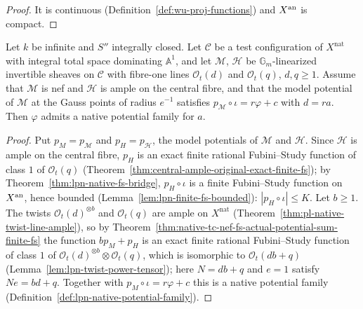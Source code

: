 \begin{proof}
It is continuous (Definition~\ref{def:wu-proj-functions}) and $X^{\mathrm{an}}$ is compact.
\end{proof}

\begin{theorem}\label{thm:lpn-native-potential-family-of-tc}
\leanok
{}
Let $k$ be infinite and $S''$ integrally closed. Let $\mathcal C$ be a test configuration of $X^{\mathrm{nat}}$ with
integral total space dominating $\mathbb A^1$, and let $\mathcal M$, $\mathcal H$ be $\mathbb G_m$-linearized
invertible sheaves on $\mathcal C$ with fibre-one lines $\mathcal O_t(d)$ and $\mathcal O_t(q)$, $d,q\ge1$. Assume
that $\mathcal M$ is nef and $\mathcal H$ is ample on the central fibre, and that the model potential of
$\mathcal M$ at the Gauss points of radius $e^{-1}$ satisfies $p_{\mathcal M}\circ\iota=r\varphi+c$ with $d=ra$. Then
$\varphi$ admits a native potential family for $a$.
\end{theorem}

\begin{proof}
Put $p_M=p_{\mathcal M}$ and $p_H=p_{\mathcal H}$, the model potentials of $\mathcal M$ and $\mathcal H$. Since
$\mathcal H$ is ample on the central fibre, $p_H$ is an exact finite rational Fubini--Study function of class $1$ of
$\mathcal O_t(q)$ (Theorem~\ref{thm:central-ample-original-exact-finite-fs}); by
Theorem~\ref{thm:lpn-native-fs-bridge}, $p_H\circ\iota$ is a finite Fubini--Study function on $X^{\mathrm{an}}$, hence bounded
(Lemma~\ref{lem:lpn-finite-fs-bounded}): $|p_H\circ\iota|\le K$. Let $b\ge1$. The twists $\mathcal O_t(d)^{\otimes b}$ and
$\mathcal O_t(q)$ are ample on $X^{\mathrm{nat}}$ (Theorem~\ref{thm:pl-native-twist-line-ample}), so by
Theorem~\ref{thm:native-tc-nef-fs-actual-potential-sum-finite-fs} the function $bp_M+p_H$ is an exact finite rational
Fubini--Study function of class $1$ of $\mathcal O_t(d)^{\otimes b}\otimes\mathcal O_t(q)$, which is isomorphic to
$\mathcal O_t(db+q)$ (Lemma~\ref{lem:lpn-twist-power-tensor}); here $N=db+q$ and $e=1$ satisfy $Ne=bd+q$. Together with
$p_M\circ\iota=r\varphi+c$ this is a native potential family (Definition~\ref{def:lpn-native-potential-family}).
\end{proof}

